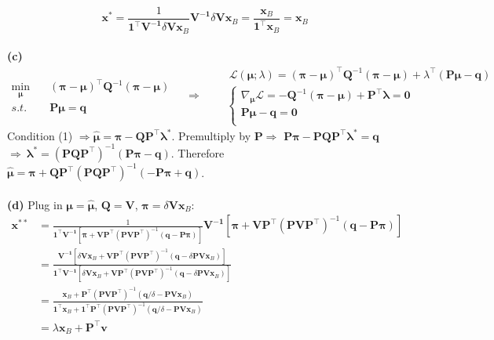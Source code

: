 \documentclass[a4paper, 8pt]{article}
\theoremstyle{definition}
\theoremstyle{hSol}
\begin{document}
	\begin{equation}
		\bm{x}^* = \frac{1}{\bm{1}^{\top}\bm{V^{-1}}\delta \bm{V}\bm{x}_B}\bm{V^{-1}}\delta \bm{V}\bm{x}_B = \frac{\bm{x}_B}{\bm{1}^{\top} \bm{x}_B} = \bm{x}_B
	\end{equation}
	~\\
	\textbf{(c)}
		\begin{equation}
		\begin{split}
			\underset{\bm{\mu}}{\min}\quad&  (\bm{\pi-\mu})^{\top}\bm{Q}^{-1} (\bm{\pi-\mu})\\
			s.t. \quad & \bm{P\mu} = \bm{q}
		\end{split}
		\quad\Rightarrow\quad
		\begin{split}
			&~\mathcal{L}(\bm{\mu}; \lambda) = (\bm{\pi-\mu})^{\top}\bm{Q}^{-1} (\bm{\pi-\mu}) + \lambda^{\top}(\bm{P\mu} - \bm{q})\\
			&\begin{cases}
			\nabla_{\bm{\mu}} \mathcal{L} = -\bm{Q}^{-1} (\bm{\pi-\mu}) + \bm{P}^{\top} \bm{\lambda} = \bm{0} \\
			\bm{P\mu} - \bm{q} = \bm{0}\\
			\end{cases}
		\end{split}
	\end{equation}
	Condition (1) $\Rightarrow \widehat{\bm{\mu}} = \bm{\pi} - \bm{Q}\bm{P}^{\top} \bm{\lambda}^*$. Premultiply by $\bm{P} \Rightarrow$ $\bm{P}\bm{\pi} - \bm{P}\bm{Q}\bm{P}^{\top} \bm{\lambda}^* = \bm{q}$ $\Rightarrow~ \bm{\lambda}^* = (\bm{P}\bm{Q}\bm{P}^{\top})^{-1}(\bm{P\pi}-\bm{q})$. Therefore $\widehat{\bm{\mu}} = \bm{\pi} + \bm{Q}\bm{P}^{\top}(\bm{P}\bm{Q}\bm{P}^{\top})^{-1}(-\bm{P\pi}+\bm{q})$.\\
	~\\
	\textbf{(d)} Plug in $\bm{\mu} = \widehat{\bm{\mu}}$, $\bm{Q}=\bm{V}$, $\bm{\pi}=\delta \bm{V}\bm{x}_B$:
	\begin{equation}
		\begin{split}
			\bm{x}^{**}  &=\frac{1}{\bm{1}^{\top}\bm{V^{-1}}[\bm{\pi} + \bm{V}\bm{P}^{\top}(\bm{P}\bm{V}\bm{P}^{\top})^{-1}(\bm{q}-\bm{P\pi})]}\bm{V^{-1}}\left[\bm{\pi} + \bm{V}\bm{P}^{\top}(\bm{P}\bm{V}\bm{P}^{\top})^{-1}(\bm{q}-\bm{P\pi})\right] \\[5pt]
			&=\frac{\bm{V^{-1}}\left[\delta \bm{V}\bm{x}_B + \bm{V}\bm{P}^{\top}(\bm{P}\bm{V}\bm{P}^{\top})^{-1}(\bm{q}-\delta\bm{P} \bm{V}\bm{x}_B)\right]}{\bm{1}^{\top}\bm{V^{-1}}[\delta \bm{V}\bm{x}_B + \bm{V}\bm{P}^{\top}(\bm{P}\bm{V}\bm{P}^{\top})^{-1}(\bm{q}-\delta\bm{P} \bm{V}\bm{x}_B)]}\\[5pt]
			&=\frac{ \bm{x}_B + \bm{P}^{\top}(\bm{P}\bm{V}\bm{P}^{\top})^{-1}(\bm{q}/\delta-\bm{P} \bm{V}\bm{x}_B)}{\bm{1}^{\top}\bm{x}_B + \bm{1}^{\top}\bm{P}^{\top}(\bm{P}\bm{V}\bm{P}^{\top})^{-1}(\bm{q}/\delta-\bm{P} \bm{V}\bm{x}_B)} \\
			&= \lambda \bm{x}_B + \bm{P}^{\top} \bm{v}
		\end{split}
	\end{equation}
\end{document}

